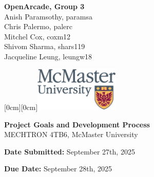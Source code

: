\documentclass[a4]{article}
\date{\today}
\begin{document}
\begin{titlepage}

    \hspace*{0mm}\textbf{\Large OpenArcade, Group 3}\\
    \hspace*{0mm} \large Anish Paramsothy, paramsa\\
    \hspace*{0mm} \large Chris Palermo, palerc\\
    \hspace*{0mm} \large Mitchel Cox, coxm12\\
    \hspace*{0mm} \large Shivom Sharma, shars119\\
    \hspace*{0mm} \large Jacqueline Leung, leungw18

    \hspace*{\textwidth} 
    \hspace{-4cm} 
    \vspace{-2cm} 
    \raisebox{1cm}[0cm][0cm]{\includegraphics[width=4cm]{m24-col_png.png}}

    \vspace{7cm} 
    
    
    \begin{center}
        \Huge \textbf{Project Goals and Development Process} \\[1em]
        \Large MECHTRON 4TB6, McMaster University
    \end{center}
    \vspace{7cm}
    
    \hspace*{0mm} \textbf{\large Date Submitted:} September 27th, 2025

    \hspace*{0mm} \textbf{\large Due Date:} September 28th, 2025
\end{titlepage}
\tableofcontents

\clearpage
\end{document}

